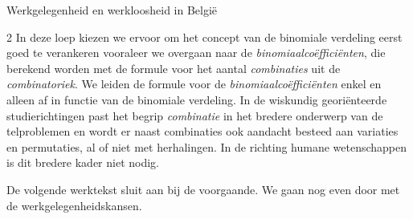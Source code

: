 \begin{lesactiviteit}{Werkgelegenheid en werkloosheid in België}
\begin{vraagenantwoord}[resume]
	
\end{vraagenantwoord}
\end{lesactiviteit}

\begin{multicols}{2}
    In deze loep kiezen we ervoor om het concept van de binomiale verdeling eerst goed te verankeren  vooraleer we overgaan naar de \emph{binomiaalcoëfficiënten}, die berekend worden met de formule voor het aantal \emph{combinaties} uit de \emph{combinatoriek}.  We leiden de formule voor de \emph{binomiaalcoëfficiënten} enkel en alleen af in functie van de binomiale verdeling. In de wiskundig georiënteerde studierichtingen past het begrip \emph{combinatie} in het bredere onderwerp van de telproblemen en wordt er naast combinaties ook aandacht besteed aan variaties en permutaties, al of niet met herhalingen. In de richting humane wetenschappen is dit bredere kader niet nodig. 
    
    De volgende werktekst sluit aan bij de voorgaande. We gaan nog even door met de werkgelegenheidskansen.
    
\end{multicols}    
    
